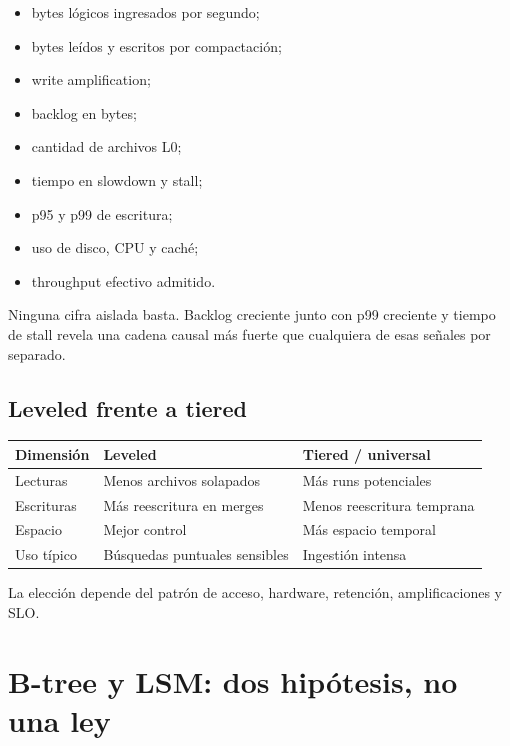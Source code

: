 \documentclass[variant=apuntes,cover=institutional,mode=screen]{ua-engineering-v6-article}
\begin{document}
\begin{itemize}
\item bytes lógicos ingresados por segundo;
\item bytes leídos y escritos por compactación;
\item write amplification;
\item backlog en bytes;
\item cantidad de archivos L0;
\item tiempo en slowdown y stall;
\item p95 y p99 de escritura;
\item uso de disco, CPU y caché;
\item throughput efectivo admitido.
\end{itemize}

Ninguna cifra aislada basta. Backlog creciente junto con p99 creciente y tiempo de stall revela una cadena causal más fuerte que cualquiera de esas señales por separado.

\subsection{Leveled frente a tiered}

\begin{center}
\begin{tabular}{p{}p{}p{}}
\toprule
Dimensión & Leveled & Tiered / universal \\
\midrule
Lecturas & Menos archivos solapados & Más runs potenciales \\
Escrituras & Más reescritura en merges & Menos reescritura temprana \\
Espacio & Mejor control & Más espacio temporal \\
Uso típico & Búsquedas puntuales sensibles & Ingestión intensa \\
\bottomrule
\end{tabular}
\end{center}

La elección depende del patrón de acceso, hardware, retención, amplificaciones y SLO.

\section{B-tree y LSM: dos hipótesis, no una ley}
\end{document}
